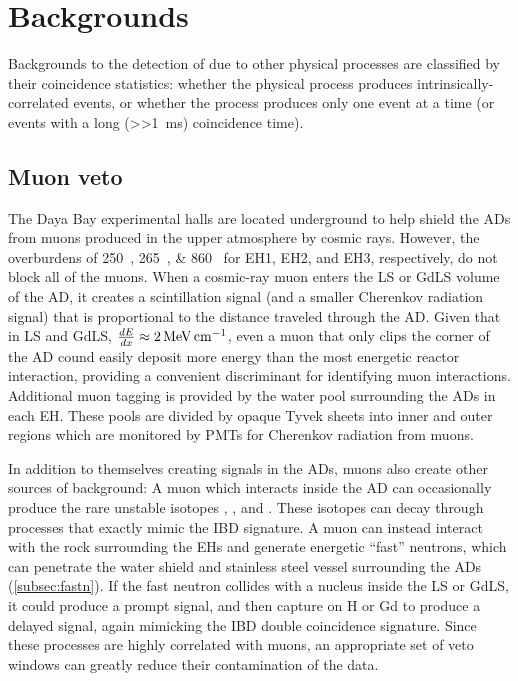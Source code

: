 \chapter{Backgrounds}
\label{ch:background}

Backgrounds to the detection of \nuebar{}
due to other physical processes
are classified by their coincidence statistics:
whether the physical process produces intrinsically-correlated events,
or whether the process produces only one event at a time
(or events with a long (\SI{>>1}{\milli\second}) coincidence time).

\section{Muon veto}
\label{sec:muonveto}

The Daya Bay experimental halls are located underground
to help shield the ADs from muons produced in the upper atmosphere by cosmic rays.
However, the overburdens of \SIlist{250;265;860}{\mwe}
for EH1, EH2, and EH3, respectively, do not block all of the muons.
When a cosmic-ray muon enters the LS or GdLS volume of the AD,
it creates a scintillation signal (and a smaller Cherenkov radiation signal)
that is proportional to the distance traveled
through the AD.
Given that in LS and GdLS, $\frac{dE}{dx} \approx \SI{2}{\mev\per\cm}$,
even a muon that only clips the corner of the AD cound easily deposit
more energy than the most energetic reactor \nuebar{} interaction,
providing a convenient discriminant for identifying muon interactions.
Additional muon tagging is provided by the water pool
surrounding the ADs in each EH.
These pools are divided by opaque Tyvek sheets into inner and outer regions
which are monitored by PMTs for Cherenkov radiation from muons.

In addition to themselves creating signals in the ADs,
muons also create other sources of background:
A muon which interacts inside the AD can occasionally produce
the rare unstable isotopes \li, \he, and \boron.
These isotopes can decay through processes that exactly mimic the IBD signature.
A muon can instead interact with the rock surrounding the EHs
and generate energetic ``fast'' neutrons,
which can penetrate the water shield and stainless steel vessel surrounding the ADs
(\cref{subsec:fastn}).
If the fast neutron collides with a nucleus inside the LS or GdLS,
it could produce a prompt signal, and then capture on H or Gd to produce
a delayed signal, again mimicking the IBD double coincidence signature.
Since these processes are highly correlated with muons,
an appropriate set of veto windows can greatly reduce their contamination of the data.


